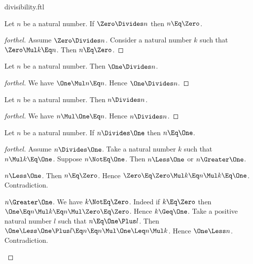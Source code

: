\documentclass{stex}
\begin{document}
\begin{smodule}{divisibility.ftl}
\begin{proposition*}[forthel]
  Let $n$ be a natural number.
  If $\Zero \Divides n$ then $n \Eq \Zero$.
\end{proposition*}
\begin{proof}[forthel]
  Assume $\Zero \Divides n$.
  Consider a natural number $k$ such that $\Zero \Mul k \Eq n$.
  Then $n \Eq \Zero$.
\end{proof}

\begin{proposition*}[forthel]
  Let $n$ be a natural number.
  Then $\One \Divides n$.
\end{proposition*}
\begin{proof}[forthel]
  We have $\One \Mul n \Eq n$.
  Hence $\One \Divides n$.
\end{proof}

\begin{proposition*}[forthel]
  Let $n$ be a natural number.
  Then $n \Divides n$.
\end{proposition*}
\begin{proof}[forthel]
  We have $n \Mul \One \Eq n$.
  Hence $n \Divides n$.
\end{proof}

\begin{proposition*}[forthel]
  Let $n$ be a natural number.
  If $n \Divides \One$ then $n \Eq \One$.
\end{proposition*}
\begin{proof}[forthel]
  Assume $n \Divides \One$.
  Take a natural number $k$ such that $n \Mul k \Eq \One$.
  Suppose $n \NotEq \One$.
  Then $n \Less \One$ or $n \Greater \One$.

  \begin{case}{$n \Less \One$.}
    Then $n \Eq \Zero$.
    Hence $\Zero
      \Eq \Zero \Mul k
      \Eq n \Mul k
      \Eq \One$.
    Contradiction.
  \end{case}

  \begin{case}{$n \Greater \One$.}
    We have $k \NotEq \Zero$.
    Indeed if $k \Eq \Zero$ then
    $\One
      \Eq n \Mul k
      \Eq n \Mul \Zero
      \Eq \Zero$.
    Hence $k \Geq \One$.
    Take a positive natural number $l$ such that $n \Eq \One \Plus l$.
    Then $\One
      \Less \One \Plus l
      \Eq n
      \Eq n \Mul \One
      \Leq n \Mul k$.
    Hence $\One \Less n$.
    Contradiction.
  \end{case}
\end{proof}


\end{smodule}
\end{document}
